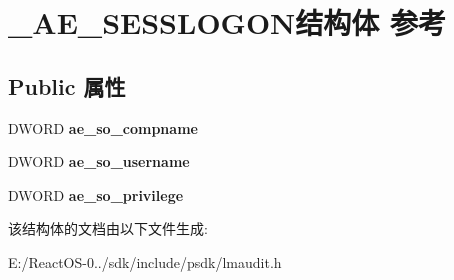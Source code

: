 \hypertarget{struct___a_e___s_e_s_s_l_o_g_o_n}{}\section{\+\_\+\+A\+E\+\_\+\+S\+E\+S\+S\+L\+O\+G\+O\+N结构体 参考}
\label{struct___a_e___s_e_s_s_l_o_g_o_n}
\subsection*{Public 属性}
\begin{DoxyCompactItemize}
\item 
\mbox{\label{struct___a_e___s_e_s_s_l_o_g_o_n_a0faca8a3e561aab0ec77bdb52c38020f}} 
D\+W\+O\+RD {\bfseries ae\+\_\+so\+\_\+compname}
\item 
\mbox{\label{struct___a_e___s_e_s_s_l_o_g_o_n_a8ca9ce91fa6816e8fc7b857c371c9a3d}} 
D\+W\+O\+RD {\bfseries ae\+\_\+so\+\_\+username}
\item 
\mbox{\label{struct___a_e___s_e_s_s_l_o_g_o_n_a0afc6b9cbbbe4df66504b6eddc2f876e}} 
D\+W\+O\+RD {\bfseries ae\+\_\+so\+\_\+privilege}
\end{DoxyCompactItemize}


该结构体的文档由以下文件生成\+:\begin{DoxyCompactItemize}
\item 
E\+:/\+React\+O\+S-\/0../sdk/include/psdk/lmaudit.\+h\end{DoxyCompactItemize}
